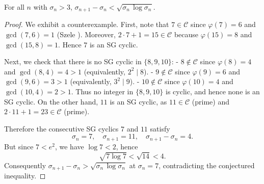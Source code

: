 \begin{theorem}\label{thm:carneiro_sg_cyclics}
For all $n$ with $\sigma_n>3$, $\sigma_{n+1}-\sigma_n<\sqrt{\sigma_n\,\log \sigma_n}$.
\end{theorem}

\begin{proof}
We exhibit a counterexample. First, note that $7\in\mathcal{C}$ since $\varphi(7)=6$ and $\gcd(7,6)=1$ (Szele \cite{Szele1947}). Moreover, $2\cdot 7+1=15\in\mathcal{C}$ because $\varphi(15)=8$ and $\gcd(15,8)=1$. Hence $7$ is an SG cyclic.

Next, we check that there is no SG cyclic in $\{8,9,10\}$:
- $8\notin\mathcal{C}$ since $\varphi(8)=4$ and $\gcd(8,4)=4>1$ (equivalently, $2^2\mid 8$).
- $9\notin\mathcal{C}$ since $\varphi(9)=6$ and $\gcd(9,6)=3>1$ (equivalently, $3^2\mid 9$).
- $10\notin\mathcal{C}$ since $\varphi(10)=4$ and $\gcd(10,4)=2>1$.
Thus no integer in $\{8,9,10\}$ is cyclic, and hence none is an SG cyclic. On the other hand, $11$ is an SG cyclic, as $11\in\mathcal{C}$ (prime) and $2\cdot 11+1=23\in\mathcal{C}$ (prime).

Therefore the consecutive SG cyclics $7$ and $11$ satisfy
$$\sigma_{n}=7,\quad \sigma_{n+1}=11,\quad \sigma_{n+1}-\sigma_n=4.$$
But since $7<e^2$, we have $\log 7<2$, hence
$$\sqrt{7\log 7}<\sqrt{14}<4.$$ 
Consequently $\sigma_{n+1}-\sigma_n>\sqrt{\sigma_n\,\log \sigma_n}$ at $\sigma_n=7$, contradicting the conjectured inequality. 
\end{proof}

